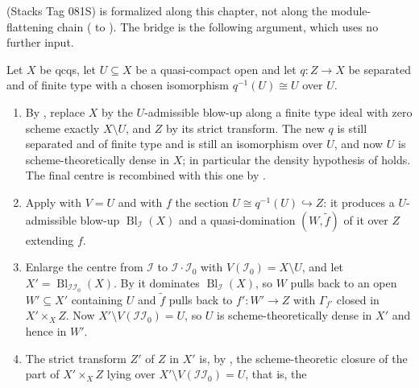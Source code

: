 \begin{remark}
   (Stacks Tag 081S) is
  formalized along this chapter, not along the module-flattening chain
  ( to
  ).  The bridge is the
  following argument, which uses no further input.

  Let $X$ be qcqs, let $U\subseteq X$ be a quasi-compact open and let
  $q\colon Z\to X$ be separated and of finite type with a chosen isomorphism
  $q^{-1}(U)\cong U$ over $U$.
  \begin{enumerate}
    \item By , replace $X$
      by the $U$-admissible blow-up along a finite type ideal with zero scheme
      exactly $X\setminus U$, and $Z$ by its strict transform.  The new $q$ is
      still separated and of finite type and is still an isomorphism over $U$,
      and now $U$ is scheme-theoretically dense in $X$; in particular the
      density hypothesis of  holds.  The
      final centre is recombined with this one by
      .
    \item Apply  with $V=U$ and with $f$
      the section $U\cong q^{-1}(U)\hookrightarrow Z$: it produces a
      $U$-admissible blow-up $\operatorname{Bl}_{\mathcal I}(X)$ and a
      quasi-domination $(W,\widetilde f)$ of it over $Z$ extending $f$.
    \item Enlarge the centre from $\mathcal I$ to $\mathcal I\cdot\mathcal I_0$
      with $V(\mathcal I_0)=X\setminus U$, and let
      $X'=\operatorname{Bl}_{\mathcal I\mathcal I_0}(X)$.  By
       it dominates
      $\operatorname{Bl}_{\mathcal I}(X)$, so $W$ pulls back to an open
      $W'\subseteq X'$ containing $U$ and $\widetilde f$ pulls back to
      $f'\colon W'\to Z$ with $\Gamma_{f'}$ closed in $X'\times_XZ$.  Now
      $X'\setminus V(\mathcal I\mathcal I_0)=U$, so $U$ is
      scheme-theoretically dense in $X'$ and hence in $W'$.
    \item The strict transform $Z'$ of $Z$ in $X'$ is, by
      , the
      scheme-theoretic closure of the part of $X'\times_XZ$ lying over
      $X'\setminus V(\mathcal I\mathcal I_0)=U$, that is, the

\end{enumerate}
\end{remark}
